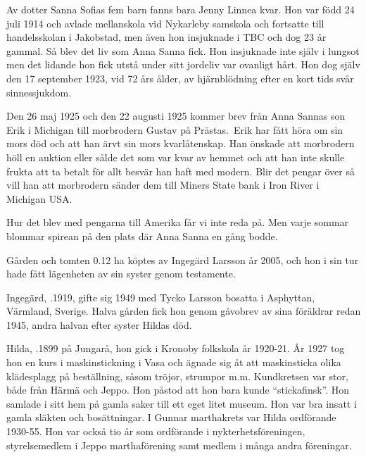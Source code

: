 Av dotter Sanna Sofias fem barn fanns bara Jenny Linnea kvar. Hon var född 24 juli 1914 och avlade mellanskola vid Nykarleby samskola och fortsatte till handelsskolan i Jakobstad, men även hon insjuknade i TBC och dog 23 år gammal.
Så blev det liv som Anna Sanna fick. Hon insjuknade inte själv i lungsot men det lidande hon fick utstå under sitt jordeliv var ovanligt hårt. Hon dog själv den 17 september 1923, vid 72 års ålder, av hjärnblödning efter en kort tids svår sinnessjukdom.

Den 26 maj 1925 och den 22 augusti 1925 kommer brev från Anna Sannas son Erik i Michigan till morbrodern Gustav på Prästas. Erik har fått höra om sin mors död och att han ärvt sin mors kvarlåtenskap. Han önskade att morbrodern höll en auktion eller sålde det som var kvar av hemmet och att han inte skulle frukta att ta betalt för allt besvär han haft med modern. Blir det pengar över så vill han att morbrodern sänder dem till Miners State bank i Iron River i Michigan USA.

Hur det blev med pengarna till Amerika får vi inte reda på. Men varje sommar blommar spirean på den plats där Anna Sanna en gång bodde.




Gården och tomten 0.12 ha köptes av Ingegärd Larsson år 2005, och hon i sin tur hade fått lägenheten av sin syster genom testamente.\jhvspace{}


Ingegärd, .1919, gifte sig 1949 med Tycko Larsson bosatta i Asphyttan, Värmland, Sverige. Halva gården fick hon genom gåvobrev av sina föräldrar redan 1945, andra halvan efter syster Hildas död.\jhvspace{}



Hilda, .1899 på Jungarå, hon gick i Kronoby folkskola år 1920-21. År 1927 tog hon en kurs i maskinstickning i Vasa och ägnade sig åt att maskinsticka olika klädesplagg på beställning, såsom tröjor, strumpor m.m. Kundkretsen var stor, både från Härmä och Jeppo. Hon påstod att hon bara kunde ``stickafinsk''. Hon samlade i sitt hem på gamla saker till ett eget litet museum. Hon var bra insatt i gamla släkten och bosättningar. I Gunnar marthakrets var Hilda ordförande 1930-55. Hon var också tio år som ordförande i nykterhetsföreningen, styrelsemedlem i Jeppo marthaförening samt medlem i många andra föreningar.


